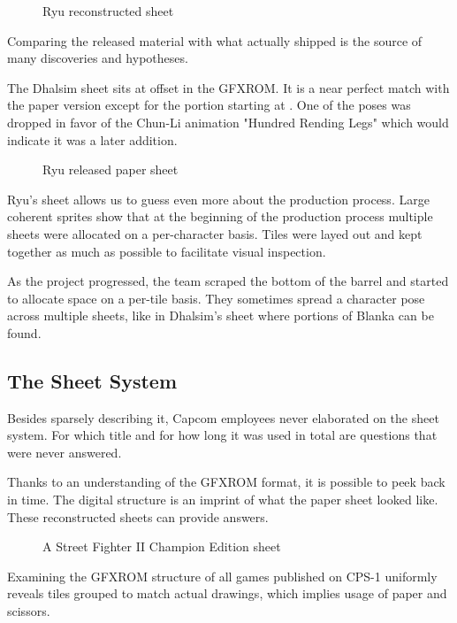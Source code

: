  \begin{figure}[H]
\caption*{Ryu reconstructed sheet}
\end{figure}


Comparing the released material with what actually shipped is the source of many discoveries and hypotheses. 

The Dhalsim sheet sits at offset  in the GFXROM. It is a near perfect match with the paper version except for the portion starting at . One of the poses was dropped in favor of the Chun-Li animation "Hundred Rending Legs" which would indicate it was a later addition. 

 \begin{figure}[H]
\caption*{Ryu released paper sheet}
\end{figure}

Ryu's sheet  allows us to guess even more about the production process. Large coherent sprites show that at the beginning of the production process multiple sheets were allocated on a per-character basis. Tiles were layed out and kept together as much as possible to facilitate visual inspection.

As the project progressed, the team scraped the bottom of the barrel and started to allocate space on a per-tile basis. They sometimes spread a character pose across multiple sheets, like in Dhalsim's sheet where portions of Blanka can be found.

\subsection{The Sheet System}
Besides sparsely describing it, Capcom employees never elaborated on the sheet system. For which title and for how long it was used in total are questions that were never answered.

Thanks to an understanding of the GFXROM format, it is possible to peek back in time. The digital structure is an imprint of what the paper sheet looked like. These reconstructed sheets can provide answers.

 \begin{figure}[H]
\caption*{A Street Fighter II Champion Edition sheet}
\end{figure}

Examining the GFXROM structure of all games published on CPS-1 uniformly reveals tiles grouped to match actual drawings, which implies usage of paper and scissors.

